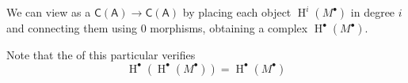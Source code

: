 \documentclass[../../main]{subfiles}
\begin{document}
\begin{remark}
  We can view  as a  \(\mathsf{C}(\mathsf{A}) \to \mathsf{C}(\mathsf{A})\) by placing each  object \(\operatorname{H}^{i}(M^{\bullet})\) in degree \(i\) and connecting them using 0 morphisms, obtaining a complex \(\operatorname{H}^{\bullet}(M^{\bullet})\).

  Note that the  of this particular  verifies
  \begin{equation*}
    \operatorname{H}^{\bullet}(\operatorname{H}^{\bullet}(M^{\bullet})) = \operatorname{H}^{\bullet}(M^{\bullet})
  \end{equation*}
\end{remark}
\end{document}
